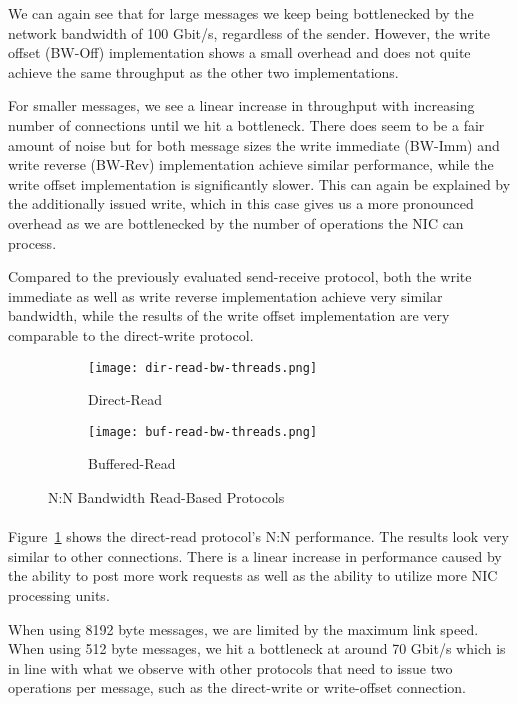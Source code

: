 We can again see that for large messages we keep being bottlenecked by the network bandwidth of 100 Gbit/s, regardless of 
the sender. However, the write offset (BW-Off) implementation shows a small overhead and does not quite achieve the same 
throughput as the other two implementations. 

For smaller messages, we see a linear increase in throughput with increasing number of connections until we hit a bottleneck. 
There does seem to be a fair amount of noise
but for both message sizes the write immediate (BW-Imm) and write reverse (BW-Rev) implementation achieve similar performance,
while the write offset implementation is significantly slower. This can again be explained by the additionally issued write, 
which in this case  gives us a more pronounced overhead as we are bottlenecked by the number of operations the NIC can process.


Compared to the previously evaluated send-receive protocol, both the write immediate as well as write reverse implementation
achieve very 
similar bandwidth, while the results of the write offset implementation are very comparable to the direct-write protocol.


\begin{figure}[ht]
  \begin{subfigure}[b]{0.49\textwidth}
  \centering
  \texttt{[image: dir-read-bw-threads.png]}
  \caption{Direct-Read}
  \label{fig:plot-dirread-bw-threads}
  \end{subfigure}
  \begin{subfigure}[b]{0.49\textwidth}
  \centering
  \texttt{[image: buf-read-bw-threads.png]}
  \caption{Buffered-Read}
  \label{fig:plot-bufread-bw-threads}
  \end{subfigure}
  \caption{N:N Bandwidth Read-Based Protocols}
\end{figure}

\paragraph{}Figure~\ref{fig:plot-dirread-bw-threads} shows the direct-read protocol's N:N performance. The results look very similar to 
other connections. There is a linear increase in performance caused by the ability to post more work requests  
as well as the ability to utilize more NIC processing units.~\cite{anuj-guide}

When using 8192 byte messages, we are limited by the maximum link speed. When using 512 byte messages, we hit a bottleneck at
around 70 Gbit/s which is in line with what we observe with other protocols that need to issue two operations per message, 
such as the direct-write or write-offset connection.



